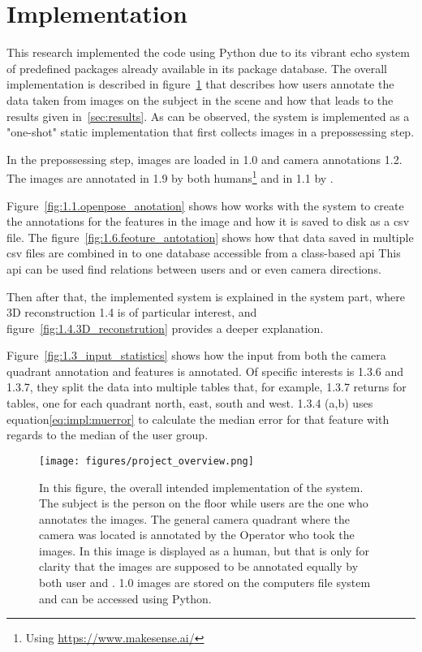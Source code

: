 
\section{Implementation}
\label{sec:work}

This research implemented the code using Python due to its vibrant echo system of predefined packages already available in its package database.
The overall implementation is described in figure~\ref{fig:project_overview} that describes how users annotate the data taken from images on the subject in the scene and how that leads to the results given in~\ref{sec:results}.
As can be observed, the system is implemented as a "one-shot" static implementation that first collects images in a prepossessing step.

In the prepossessing step, images are loaded in 1.0 and camera annotations 1.2.
The images are annotated in 1.9 by both humans\footnote{Using \url{https://www.makesense.ai/}} and in 1.1 by \openpose{ }.

Figure~\ref{fig:1.1.openpose_anotation} shows how \openpose{ } works with the system to create the annotations for the features in the image and how it is saved to disk as a \ac{csv} file.
The figure~\ref{fig:1.6.feoture_antotation} shows how that data saved in multiple \ac{csv} files are combined in to one database accessible from a class-based \ac{api}
This \ac{api} can be used find relations between users and \openpose{ } or even camera directions.

Then after that, the implemented system is explained in the system part, where 3D reconstruction 1.4 is of particular interest, and figure~\ref{fig:1.4.3D_reconstrution} provides a deeper explanation.

Figure~\ref {fig:1.3_input_statistics} shows how the input from both the camera quadrant annotation and features is annotated.
Of specific interests is 1.3.6 and 1.3.7, they split the data into multiple tables that, for example, 1.3.7 returns for tables, one for each quadrant north, east, south and west.
1.3.4 (a,b) uses equation\ref{eq:impl:muerror} to calculate the median error for that feature with regards to the median of the user group.




\begin{figure}[ht]
\begin{center}
    \texttt{[image: figures/project\_overview.png]}
\end{center}
\caption[Project Overview]{In this figure, the overall intended implementation of the system. The subject is the person on the floor while users are the one who annotates the images. The general camera quadrant where the camera was located is annotated by the Operator who took the images. In this image \openpose is displayed as a human, but that is only for clarity that the images are supposed to be annotated equally by both user and \openpose. 1.0 images are stored on the computers file system and can be accessed using Python.}
\label{fig:project_overview}
\end{figure}


